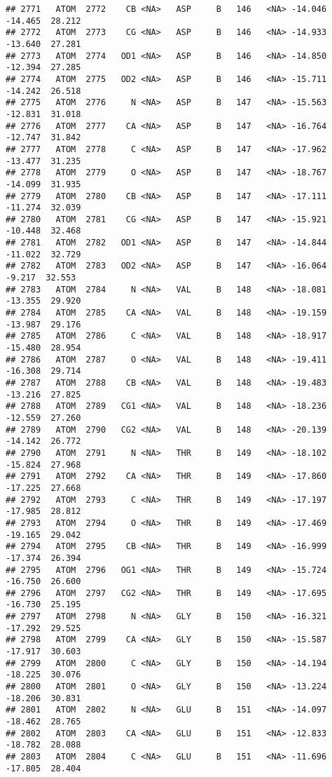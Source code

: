 \documentclass[
]{article}
\begin{document}
\begin{verbatim}
## 2771   ATOM  2772    CB <NA>   ASP     B   146   <NA> -14.046 -14.465  28.212
## 2772   ATOM  2773    CG <NA>   ASP     B   146   <NA> -14.933 -13.640  27.281
## 2773   ATOM  2774   OD1 <NA>   ASP     B   146   <NA> -14.850 -12.394  27.285
## 2774   ATOM  2775   OD2 <NA>   ASP     B   146   <NA> -15.711 -14.242  26.518
## 2775   ATOM  2776     N <NA>   ASP     B   147   <NA> -15.563 -12.831  31.018
## 2776   ATOM  2777    CA <NA>   ASP     B   147   <NA> -16.764 -12.747  31.842
## 2777   ATOM  2778     C <NA>   ASP     B   147   <NA> -17.962 -13.477  31.235
## 2778   ATOM  2779     O <NA>   ASP     B   147   <NA> -18.767 -14.099  31.935
## 2779   ATOM  2780    CB <NA>   ASP     B   147   <NA> -17.111 -11.274  32.039
## 2780   ATOM  2781    CG <NA>   ASP     B   147   <NA> -15.921 -10.448  32.468
## 2781   ATOM  2782   OD1 <NA>   ASP     B   147   <NA> -14.844 -11.022  32.729
## 2782   ATOM  2783   OD2 <NA>   ASP     B   147   <NA> -16.064  -9.217  32.553
## 2783   ATOM  2784     N <NA>   VAL     B   148   <NA> -18.081 -13.355  29.920
## 2784   ATOM  2785    CA <NA>   VAL     B   148   <NA> -19.159 -13.987  29.176
## 2785   ATOM  2786     C <NA>   VAL     B   148   <NA> -18.917 -15.480  28.954
## 2786   ATOM  2787     O <NA>   VAL     B   148   <NA> -19.411 -16.308  29.714
## 2787   ATOM  2788    CB <NA>   VAL     B   148   <NA> -19.483 -13.216  27.825
## 2788   ATOM  2789   CG1 <NA>   VAL     B   148   <NA> -18.236 -12.559  27.260
## 2789   ATOM  2790   CG2 <NA>   VAL     B   148   <NA> -20.139 -14.142  26.772
## 2790   ATOM  2791     N <NA>   THR     B   149   <NA> -18.102 -15.824  27.968
## 2791   ATOM  2792    CA <NA>   THR     B   149   <NA> -17.860 -17.225  27.668
## 2792   ATOM  2793     C <NA>   THR     B   149   <NA> -17.197 -17.985  28.812
## 2793   ATOM  2794     O <NA>   THR     B   149   <NA> -17.469 -19.165  29.042
## 2794   ATOM  2795    CB <NA>   THR     B   149   <NA> -16.999 -17.374  26.394
## 2795   ATOM  2796   OG1 <NA>   THR     B   149   <NA> -15.724 -16.750  26.600
## 2796   ATOM  2797   CG2 <NA>   THR     B   149   <NA> -17.695 -16.730  25.195
## 2797   ATOM  2798     N <NA>   GLY     B   150   <NA> -16.321 -17.292  29.525
## 2798   ATOM  2799    CA <NA>   GLY     B   150   <NA> -15.587 -17.917  30.603
## 2799   ATOM  2800     C <NA>   GLY     B   150   <NA> -14.194 -18.225  30.076
## 2800   ATOM  2801     O <NA>   GLY     B   150   <NA> -13.224 -18.206  30.831
## 2801   ATOM  2802     N <NA>   GLU     B   151   <NA> -14.097 -18.462  28.765
## 2802   ATOM  2803    CA <NA>   GLU     B   151   <NA> -12.833 -18.782  28.088
## 2803   ATOM  2804     C <NA>   GLU     B   151   <NA> -11.696 -17.805  28.404

\end{verbatim}
\end{document}
